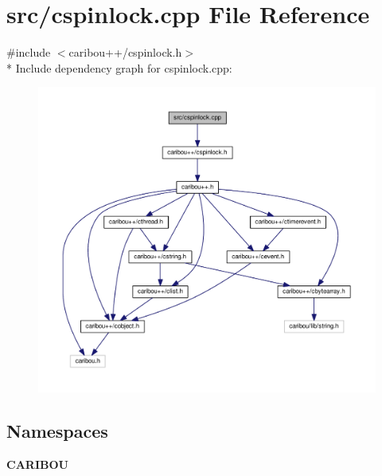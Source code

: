 \section{src/cspinlock.cpp File Reference}
\label{cspinlock_8cpp}
{\ttfamily \#include $<$caribou++/cspinlock.\+h$>$}\\*
Include dependency graph for cspinlock.\+cpp\+:
\nopagebreak
\begin{figure}[H]
\begin{center}
\leavevmode
\includegraphics[width=350pt]{cspinlock_8cpp__incl}
\end{center}
\end{figure}
\subsection*{Namespaces}
\begin{DoxyCompactItemize}
\item 
 {\bf C\+A\+R\+I\+B\+OU}
\end{DoxyCompactItemize}
